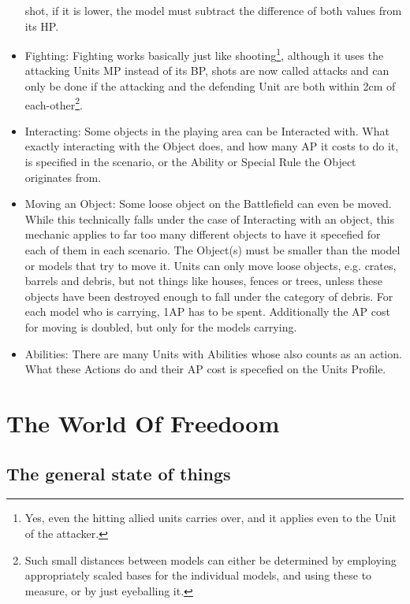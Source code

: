 \documentclass[a4paper,12pt]{book}
\begin{document}
\begin{adjustwidth}{-2cm}{-2cm}
\begin{multicols}{2}
\begin{itemize}
shot, if it is lower, the model must subtract the difference of both values from its HP. 
	\item Fighting: Fighting works basically just like shooting\footnote{Yes, even the hitting allied units carries over, and it applies even to the Unit of the attacker.}, although it uses the attacking Units MP instead of its BP, shots are now called attacks and can only be done if the attacking and the defending Unit are both within 2cm of each-other\footnote{Such small distances between models can either be determined by employing appropriately scaled bases for the individual models, and using these to measure, or by just eyeballing it.}. 
	\item Interacting: Some objects in the playing area can be Interacted with. What exactly interacting with the Object does, and how many AP it costs to do it, is specified in the scenario, or the Ability or Special Rule the Object originates from.
	\item Moving an Object: Some loose object on the Battlefield can even be moved. While this technically falls under the case of Interacting with an object, this mechanic applies to far too many different objects to have it specefied for each of them in each scenario. The Object(s) must be smaller than the model or models that try to move it.  Units can only move loose objects, e.g. crates, barrels and debris, but not things like houses, fences or trees, unless these objects have been destroyed enough to fall under the category of debris.  For each model who is carrying, 1AP has to be spent. Additionally the AP cost for moving is doubled, but only for the models carrying.
	\item Abilities: There are many Units with Abilities whose also counts as an action. What these Actions do and their AP cost is specefied on the Units Profile.

	
\end{itemize}
\end{multicols}
\end{adjustwidth}


\pagebreak

\chapter{The World Of Freedoom}

\section{The general state of things}
\end{document}
